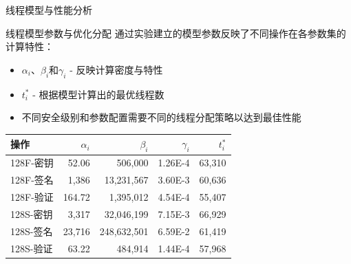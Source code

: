 \documentclass{beamer}
\begin{document}
\begin{frame}{线程模型与性能分析}
  \begin{block}{线程模型参数与优化分配}
    通过实验建立的模型参数反映了不同操作在各参数集的计算特性：
    \begin{itemize}
      \item $\alpha_i$、$\beta_i$和$\gamma_i$ - 反映计算密度与特性
      \item $t_i^*$ - 根据模型计算出的最优线程数
      \item 不同安全级别和参数配置需要不同的线程分配策略以达到最佳性能
    \end{itemize}
  \end{block}

  \begin{center}
    \footnotesize
    \begin{tabular}{lrrrr}
      \toprule
      \textbf{操作} & \boldmath$\alpha_i$ & \boldmath$\beta_i$ & \boldmath$\gamma_i$ & \boldmath$t_i^*$ \\
      \midrule
      128F-密钥 & 52.06 & 506,000 & 1.26E-4 & 63,310 \\
      128F-签名 & 1,386 & 13,231,567 & 3.60E-3 & 60,636 \\
      128F-验证 & 164.72 & 1,395,012 & 4.54E-4 & 55,407 \\
      128S-密钥 & 3,317 & 32,046,199 & 7.15E-3 & 66,929 \\
      128S-签名 & 23,716 & 248,632,501 & 6.59E-2 & 61,419 \\
      128S-验证 & 63.22 & 484,914 & 1.44E-4 & 57,968 \\
      \bottomrule
    \end{tabular}
  \end{center}
\end{frame}
\end{document}
